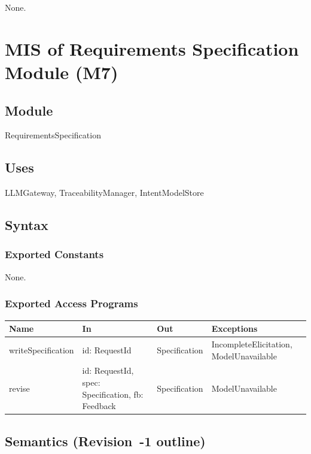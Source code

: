 \documentclass[12pt, titlepage]{article}
\begin{document}
None.

\newpage
\section{MIS of Requirements Specification Module (M7)} \label{MISSpec}

\subsection{Module}

RequirementsSpecification

\subsection{Uses}

LLMGateway, TraceabilityManager, IntentModelStore

\subsection{Syntax}

\subsubsection{Exported Constants}

None.

\subsubsection{Exported Access Programs}

\begin{center}
\small
\begin{tabular}{>{\raggedright\arraybackslash}p{3.7cm} >{\raggedright\arraybackslash}p{3.8cm} >{\raggedright\arraybackslash}p{3.6cm} >{\raggedright\arraybackslash}p{3.7cm}}
\hline
\textbf{Name} & \textbf{In} & \textbf{Out} & \textbf{Exceptions} \\
\hline
writeSpecification & id: RequestId & Specification & IncompleteElicitation, ModelUnavailable \\
revise & id: RequestId, spec: Specification, fb: Feedback & Specification & ModelUnavailable \\
\hline
\end{tabular}
\end{center}

\subsection{Semantics (Revision~-1 outline)}
\end{document}
